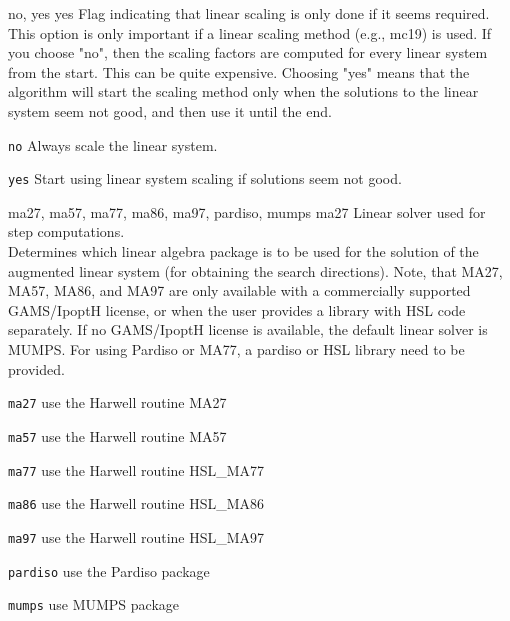 %
{\ttfamily no, yes}%
{yes}%
{Flag indicating that linear scaling is only done if it seems required.\\
This option is only important if a linear scaling method (e.g., mc19) is used.  If you choose "no", then the scaling factors are computed for every linear system from the start.  This can be quite expensive. Choosing "yes" means that the algorithm will start the scaling method only when the solutions to the linear system seem not good, and then use it until the end.}%
{\begin{list}{}{
\setlength{\parsep}{0em}
\setlength{\leftmargin}{5ex}
\setlength{\labelwidth}{2ex}
\setlength{\itemindent}{0ex}
\setlength{\topsep}{0pt}}
\item[\texttt{no}] Always scale the linear system.
\item[\texttt{yes}] Start using linear system scaling if solutions seem not good.
\end{list}
}

%
{\ttfamily ma27, ma57, ma77, ma86, ma97, pardiso, mumps}%
{ma27}%
{Linear solver used for step computations.\\
Determines which linear algebra package is to be used for the solution of the augmented linear system (for obtaining the search directions). Note, that MA27, MA57, MA86, and MA97 are only available with a commercially supported GAMS/IpoptH license, or when the user provides a library with HSL code separately. If no GAMS/IpoptH license is available, the default linear solver is MUMPS. For using Pardiso or MA77, a pardiso or HSL library need to be provided.}%
{\begin{list}{}{
\setlength{\parsep}{0em}
\setlength{\leftmargin}{5ex}
\setlength{\labelwidth}{2ex}
\setlength{\itemindent}{0ex}
\setlength{\topsep}{0pt}}
\item[\texttt{ma27}] use the Harwell routine MA27
\item[\texttt{ma57}] use the Harwell routine MA57
\item[\texttt{ma77}] use the Harwell routine HSL\_MA77
\item[\texttt{ma86}] use the Harwell routine HSL\_MA86
\item[\texttt{ma97}] use the Harwell routine HSL\_MA97
\item[\texttt{pardiso}] use the Pardiso package
\item[\texttt{mumps}] use MUMPS package
\end{list}
}

